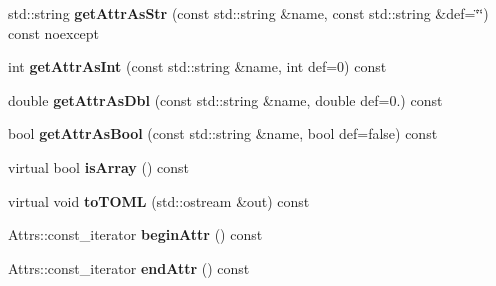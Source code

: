 \begin{DoxyCompactItemize}
\mbox{\label{classtheoria_1_1config_1_1Config_a45702e009219115ee14b11ad1f0a851a}} 
std\+::string {\bfseries get\+Attr\+As\+Str} (const std\+::string \&name, const std\+::string \&def=\char`\"{}\char`\"{}) const noexcept
\item 
\mbox{\label{classtheoria_1_1config_1_1Config_a991d0271d01d4f77f25a980399e88a60}} 
int {\bfseries get\+Attr\+As\+Int} (const std\+::string \&name, int def=0) const
\item 
\mbox{\label{classtheoria_1_1config_1_1Config_a9920f07e7a493ad3c5d5712abc85f301}} 
double {\bfseries get\+Attr\+As\+Dbl} (const std\+::string \&name, double def=0.) const
\item 
\mbox{\label{classtheoria_1_1config_1_1Config_adcfd22ac6dc3293f1306a33591ab53c8}} 
bool {\bfseries get\+Attr\+As\+Bool} (const std\+::string \&name, bool def=false) const
\item 
\mbox{\label{classtheoria_1_1config_1_1Config_a1c634f42efd6c6d4463136ec24a1e7e5}} 
virtual bool {\bfseries is\+Array} () const
\item 
\mbox{\label{classtheoria_1_1config_1_1Config_a6fe5db76067cd30d5b5ed02c49770d6f}} 
virtual void {\bfseries to\+T\+O\+ML} (std\+::ostream \&out) const
\item 
\mbox{\label{classtheoria_1_1config_1_1Config_a4bd7712d99a507b1da47da9257094051}} 
Attrs\+::const\+\_\+iterator {\bfseries begin\+Attr} () const
\item 
\mbox{\label{classtheoria_1_1config_1_1Config_a3d4ea72c3b43c8674456fdc263d39e39}} 
Attrs\+::const\+\_\+iterator {\bfseries end\+Attr} () const
\end{DoxyCompactItemize}
